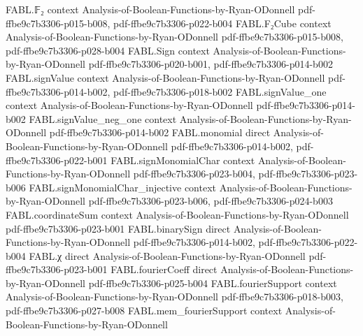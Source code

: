 \begin{theorem}
\leanok
{}
\proofstep
  {FABL.𝔽₂}
  {context}
  {Analysis-of-Boolean-Functions-by-Ryan-ODonnell}
  {pdf-ffbe9c7b3306-p015-b008,
    pdf-ffbe9c7b3306-p022-b004}
\proofstep
  {FABL.F₂Cube}
  {context}
  {Analysis-of-Boolean-Functions-by-Ryan-ODonnell}
  {pdf-ffbe9c7b3306-p015-b008,
    pdf-ffbe9c7b3306-p028-b004}
\proofstep
  {FABL.Sign}
  {context}
  {Analysis-of-Boolean-Functions-by-Ryan-ODonnell}
  {pdf-ffbe9c7b3306-p020-b001,
    pdf-ffbe9c7b3306-p014-b002}
\proofstep
  {FABL.signValue}
  {context}
  {Analysis-of-Boolean-Functions-by-Ryan-ODonnell}
  {pdf-ffbe9c7b3306-p014-b002,
    pdf-ffbe9c7b3306-p018-b002}
\proofstep
  {FABL.signValue_one}
  {context}
  {Analysis-of-Boolean-Functions-by-Ryan-ODonnell}
  {pdf-ffbe9c7b3306-p014-b002}
\proofstep
  {FABL.signValue_neg_one}
  {context}
  {Analysis-of-Boolean-Functions-by-Ryan-ODonnell}
  {pdf-ffbe9c7b3306-p014-b002}
\proofstep
  {FABL.monomial}
  {direct}
  {Analysis-of-Boolean-Functions-by-Ryan-ODonnell}
  {pdf-ffbe9c7b3306-p014-b002,
    pdf-ffbe9c7b3306-p022-b001}
\proofstep
  {FABL.signMonomialChar}
  {context}
  {Analysis-of-Boolean-Functions-by-Ryan-ODonnell}
  {pdf-ffbe9c7b3306-p023-b004,
    pdf-ffbe9c7b3306-p023-b006}
\proofstep
  {FABL.signMonomialChar_injective}
  {context}
  {Analysis-of-Boolean-Functions-by-Ryan-ODonnell}
  {pdf-ffbe9c7b3306-p023-b006,
    pdf-ffbe9c7b3306-p024-b003}
\proofstep
  {FABL.coordinateSum}
  {context}
  {Analysis-of-Boolean-Functions-by-Ryan-ODonnell}
  {pdf-ffbe9c7b3306-p023-b001}
\proofstep
  {FABL.binarySign}
  {direct}
  {Analysis-of-Boolean-Functions-by-Ryan-ODonnell}
  {pdf-ffbe9c7b3306-p014-b002,
    pdf-ffbe9c7b3306-p022-b004}
\proofstep
  {FABL.χ}
  {direct}
  {Analysis-of-Boolean-Functions-by-Ryan-ODonnell}
  {pdf-ffbe9c7b3306-p023-b001}
\proofstep
  {FABL.fourierCoeff}
  {direct}
  {Analysis-of-Boolean-Functions-by-Ryan-ODonnell}
  {pdf-ffbe9c7b3306-p025-b004}
\proofstep
  {FABL.fourierSupport}
  {context}
  {Analysis-of-Boolean-Functions-by-Ryan-ODonnell}
  {pdf-ffbe9c7b3306-p018-b003,
    pdf-ffbe9c7b3306-p027-b008}
\proofstep
  {FABL.mem_fourierSupport}
  {context}
  {Analysis-of-Boolean-Functions-by-Ryan-ODonnell}

\end{theorem}
